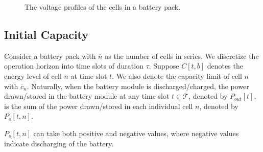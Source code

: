 \documentclass[10pt,twocolumn]{IEEEtran}
\begin{document}
\begin{figure}[t]
\centering
\vspace{-0.25cm}
{} \vspace{-0.3cm}
\caption{The voltage profiles of the cells in a battery pack.}
\vspace{-0.4cm}
\label{fig:packoperation}
\end{figure}

\vspace{-0.1cm}

\subsection{Initial Capacity}
Consider a battery pack with $\overline{n}$  as the number of cells in series. 
We discretize the operation horizon into time slots of duration $\tau$.
Suppose $C[t, b]$ denotes the energy level of cell $n$ at time slot $t$.
We also denote the capacity limit of cell $n$ with $\overline{c}_n$.
Naturally, when the battery module is discharged/charged,  the power drawn/stored in the battery module at any time slot $t \in \mathcal{T}$, denoted by $P_{out}[t]$,  is the sum of the power drawn/stored in each individual cell $n$, denoted by $P_{o}[t,n]$.

$P_{o}[t,n]$ can take both positive and negative values, where negative values indicate discharging of the battery.
\end{document}
